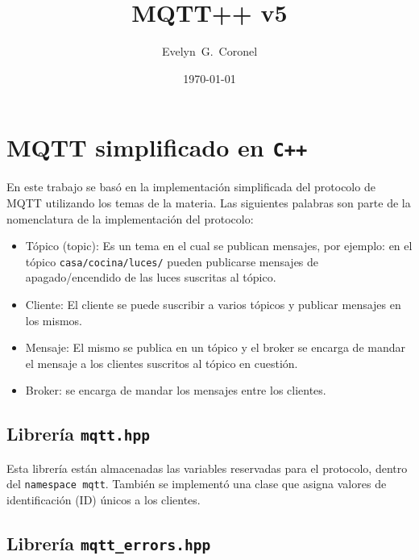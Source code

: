 


\title{MQTT++ v5}
\author{Evelyn~G.~Coronel}


\date[]{\lowercase{\today}} %

\maketitle

\section{MQTT simplificado en \texttt{C++}}

    En este trabajo se basó en la implementación simplificada del protocolo de MQTT utilizando los temas de la materia. Las siguientes palabras son parte de la nomenclatura de la implementación del protocolo:

    \begin{itemize}
        \item Tópico (topic): Es un tema en el cual se publican mensajes, por ejemplo: en el tópico \verb|casa/cocina/luces/| pueden publicarse mensajes de apagado/encendido de las luces suscritas al tópico.
        \item Cliente: El cliente se puede  suscribir a varios tópicos y publicar mensajes en los mismos.
        \item Mensaje: El mismo se publica en un tópico y el broker se encarga de mandar el mensaje a los clientes suscritos al tópico en cuestión.
        \item Broker: se encarga de mandar los mensajes entre los clientes.
    \end{itemize}

\subsection{Librería \texttt{mqtt.hpp}}

Esta  librería están almacenadas las variables reservadas para el protocolo, dentro del \texttt{namespace mqtt}. También se implementó una clase que asigna valores de identificación (ID) únicos a los clientes.

\subsection{Librería \texttt{mqtt\_errors.hpp}}

